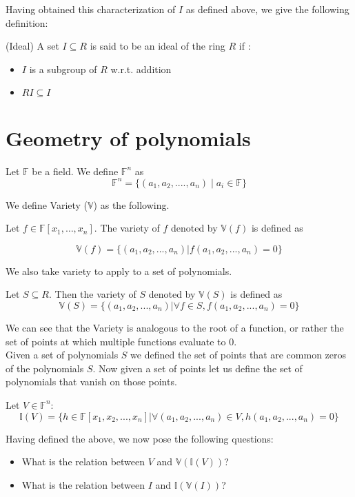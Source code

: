Having obtained this characterization of $I$ as defined above, we give the following definition:
\begin{definition} (Ideal)
A set $I\subseteq R$ is said to be an ideal of the ring $R$ if :
\begin{itemize}
\item $I$ is a subgroup of $R$ w.r.t. addition
\item $RI \subseteq I$
\end{itemize}
\end{definition}

\section{Geometry of polynomials}
Let $\mathbb{F}$ be a field. We define $\mathbb{F}^n$ as 
\[
\mathbb{F}^n = \{(a_1,a_2,....,a_n) \mid a_i \in \mathbb{F}\}
\]

We define Variety ($\mathbb{V}$) as the following.

Let $f\in\mathbb{F}[x_1,\dots,x_n]$. The variety of $f$ denoted by $\mathbb{V}(f)$ is defined as

\begin{equation}
\mathbb{V}(f) = \{(a_1,a_2,...,a_n) | f(a_1,a_2,...,a_n)=0\}
\end{equation}

We also take variety to apply to a set of polynomials. 

Let $S \subseteq R$. Then the variety of $S$ denoted by $\mathbb{V}(S)$ is defined as 
\begin{equation}
\mathbb{V}(S) = \{(a_1,a_2,...,a_n) | \forall f \in S, f(a_1,a_2,...,a_n)=0\}
\end{equation}

We can see that the Variety is analogous to the root of a function, or rather the set of points at which multiple functions evaluate to 0.\\

Given a set of polynomials $S$ we defined the set of points that are common zeros of the polynomials $S$. Now given a set of points let us define the set of polynomials that vanish on those points. 



Let $V \in \mathbb{F}^n$:
\begin{equation}
\mathbb{I}(V) = \{h \in \mathbb{F}[x_1,x_2,...,x_n] | \forall (a_1,a_2,...,a_n) \in V, h(a_1,a_2,...,a_n) = 0 \}
\end{equation}


Having defined the above, we now pose the following questions:
\begin{itemize}
\item What is the relation between $V$ and $\mathbb{V}(\mathbb{I}(V))$?
\item What is the relation between $I$ and $\mathbb{I}(\mathbb{V}(I))$?
\end{itemize}









